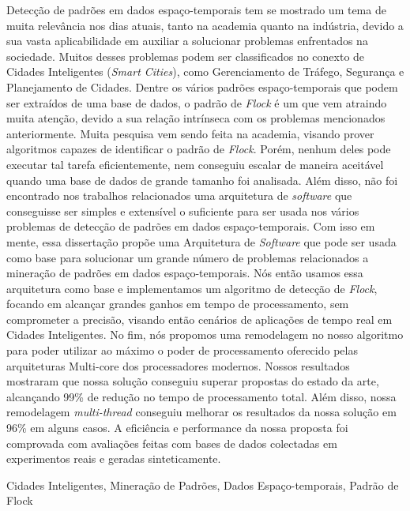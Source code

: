Detecção de padrões em dados espaço-temporais tem se mostrado um tema de muita relevância nos dias atuais, tanto na
academia quanto na indústria, devido a sua vasta aplicabilidade em auxiliar a solucionar problemas enfrentados na
sociedade. Muitos desses problemas podem ser classificados no conexto de Cidades Inteligentes (\textit{Smart Cities}),
como Gerenciamento de Tráfego, Segurança e Planejamento de Cidades. Dentre os vários padrões espaço-temporais que podem
ser extraídos de uma base de dados, o padrão de \textit{Flock} é um que vem atraindo muita atenção, devido a sua relação
intrínseca com os problemas mencionados anteriormente. Muita pesquisa vem sendo feita na academia, visando prover
algoritmos capazes de identificar o padrão de \textit{Flock}. Porém, nenhum deles pode executar tal tarefa
eficientemente, nem conseguiu escalar de maneira aceitável quando uma base de dados de grande tamanho foi analisada.
Além disso, não foi encontrado nos trabalhos relacionados uma arquitetura de \textit{software} que conseguisse ser
simples e extensível o suficiente para ser usada nos vários problemas de detecção de padrões em dados espaço-temporais.
Com isso em mente, essa dissertação propõe uma Arquitetura de \textit{Software} que pode ser usada como base para
solucionar um grande número de problemas relacionados a mineração de padrões em dados espaço-temporais. Nós então usamos
essa arquitetura como base e implementamos um algoritmo de detecção de \textit{Flock}, focando em alcançar grandes
ganhos em tempo de processamento, sem comprometer a precisão, visando então cenários de aplicações de tempo real em
Cidades Inteligentes. No fim, nós propomos uma remodelagem no nosso algoritmo para poder utilizar ao máximo o poder de
processamento oferecido pelas arquiteturas Multi-core dos processadores modernos. Nossos resultados mostraram que nossa
solução conseguiu superar propostas do estado da arte, alcançando 99\% de redução no tempo de processamento total. Além
disso, nossa remodelagem \textit{multi-thread} conseguiu melhorar os resultados da nossa solução em 96\% em alguns
casos. A eficiência e performance da nossa proposta foi comprovada com avaliações feitas com bases de dados colectadas
em experimentos reais e geradas sinteticamente.

\begin{keywords}
Cidades Inteligentes, Mineração de Padrões, Dados Espaço-temporais, Padrão de Flock
\end{keywords}
